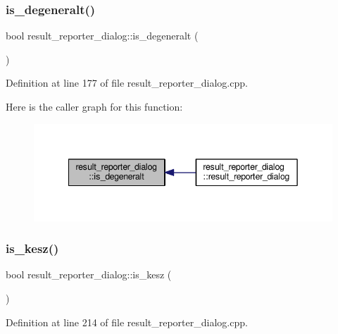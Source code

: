 \subsubsection{\texorpdfstring{is\+\_\+degeneralt()}{is\_degeneralt()}}
{\footnotesize\ttfamily bool result\+\_\+reporter\+\_\+dialog\+::is\+\_\+degeneralt (\begin{DoxyParamCaption}{ }\end{DoxyParamCaption})\hspace{0.3cm}{\ttfamily [private]}}



Definition at line 177 of file result\+\_\+reporter\+\_\+dialog.\+cpp.

Here is the caller graph for this function\+:\nopagebreak
\begin{figure}[H]
\begin{center}
\leavevmode
\includegraphics[width=342pt]{classresult__reporter__dialog_acd982d3fb89f9d533015850dfc952439_icgraph}
\end{center}
\end{figure}
\mbox{\label{classresult__reporter__dialog_aa01c9e3700c0ad800faaa1e1e7e27cda}} 
\subsubsection{\texorpdfstring{is\+\_\+kesz()}{is\_kesz()}}
{\footnotesize\ttfamily bool result\+\_\+reporter\+\_\+dialog\+::is\+\_\+kesz (\begin{DoxyParamCaption}{ }\end{DoxyParamCaption})\hspace{0.3cm}{\ttfamily [private]}}



Definition at line 214 of file result\+\_\+reporter\+\_\+dialog.\+cpp.


